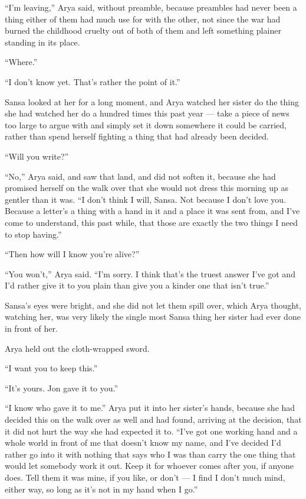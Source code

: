 “I’m leaving,” Arya said, without preamble, because preambles had never been a thing either of them had much use for with the other, not since the war had burned the childhood cruelty out of both of them and left something plainer standing in its place.

“Where.”

“I don’t know yet. That’s rather the point of it.”

Sansa looked at her for a long moment, and Arya watched her sister do the thing she had watched her do a hundred times this past year — take a piece of news too large to argue with and simply set it down somewhere it could be carried, rather than spend herself fighting a thing that had already been decided.

“Will you write?”

“No,” Arya said, and saw that land, and did not soften it, because she had promised herself on the walk over that she would not dress this morning up as gentler than it was. “I don’t think I will, Sansa. Not because I don’t love you. Because a letter’s a thing with a hand in it and a place it was sent from, and I’ve come to understand, this past while, that those are exactly the two things I need to stop having.”

“Then how will I know you’re alive?”

“You won’t,” Arya said. “I’m sorry. I think that’s the truest answer I’ve got and I’d rather give it to you plain than give you a kinder one that isn’t true.”

Sansa’s eyes were bright, and she did not let them spill over, which Arya thought, watching her, was very likely the single most Sansa thing her sister had ever done in front of her.

Arya held out the cloth-wrapped sword.

“I want you to keep this.”

“It’s yours. Jon gave it to you.”

“I know who gave it to me.” Arya put it into her sister’s hands, because she had decided this on the walk over as well and had found, arriving at the decision, that it did not hurt the way she had expected it to. “I’ve got one working hand and a whole world in front of me that doesn’t know my name, and I’ve decided I’d rather go into it with nothing that says who I was than carry the one thing that would let somebody work it out. Keep it for whoever comes after you, if anyone does. Tell them it was mine, if you like, or don’t — I find I don’t much mind, either way, so long as it’s not in my hand when I go.”

